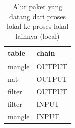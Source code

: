\begin{table}[H]
	\caption{Alur paket yang datang dari proses lokal ke proses lokal lainnya (local)}
	\label{table:local_to_local}
	\centering
	\begin{tabular}{ll}
		\hline
		\rowcolor[HTML]{C0C0C0} 
		table  & chain  \\ \hline
		mangle & OUTPUT \\
		nat    & OUTPUT \\
		filter & OUTPUT \\
		filter & INPUT  \\
		mangle & INPUT  \\ \hline
	\end{tabular}
\end{table}